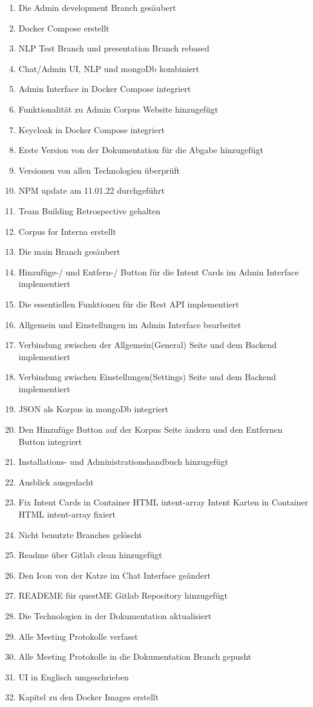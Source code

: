 \begin{enumerate}
    \item Die Admin development Branch gesäubert
    \item Docker Compose erstellt
    \item NLP Test Branch und presentation Branch rebased
    \item Chat/Admin UI, NLP und mongoDb kombiniert
    \item Admin Interface in Docker Compose integriert
    \item Funktionalität zu Admin Corpus Website hinzugefügt
    \item Keycloak in Docker Compose integriert
    \item Erste Version von der Dokumentation für die Abgabe hinzugefügt
    \item Versionen von allen Technologien überprüft
    \item NPM update am 11.01.22 durchgeführt
    \item Team Building Retrospective gehalten
    \item Corpus for Interna erstellt
    \item Die main Branch gesäubert
    \item Hinzufüge-/ und Entfern-/ Button für die Intent Cards im Admin Interface implementiert
    \item Die essentiellen Funktionen für die Rest API implementiert
    \item Allgemein und Einstellungen im Admin Interface bearbeitet
    \item Verbindung zwischen der Allgemein(General) Seite und dem Backend implementiert
    \item Verbindung zwischen Einstellungen(Settings) Seite und dem Backend implementiert
    \item JSON als Korpus in mongoDb integriert
    \item Den Hinzufüge Button auf der Korpus Seite ändern und den Entfernen Button integriert
    \item Installations- und Administrationshandbuch hinzugefügt
    \item Ausblick ausgedacht
    \item Fix Intent Cards in Container HTML intent-array Intent Karten in Container HTML intent-array fixiert
    \item Nicht benutzte Branches gelöscht
    \item Readme über Gitlab clean hinzugefügt
    \item Den Icon von der Katze im Chat Interface geändert
    \item READEME für questME Gitlab Repository hinzugefügt
    \item Die Technologien in der Dokumentation aktualisiert
    \item Alle Meeting Protokolle verfasst
    \item Alle Meeting Protokolle in die Dokumentation Branch gepusht
    \item UI in Englisch umgeschrieben
    \item Kapitel zu den Docker Images erstellt
\end{enumerate}

